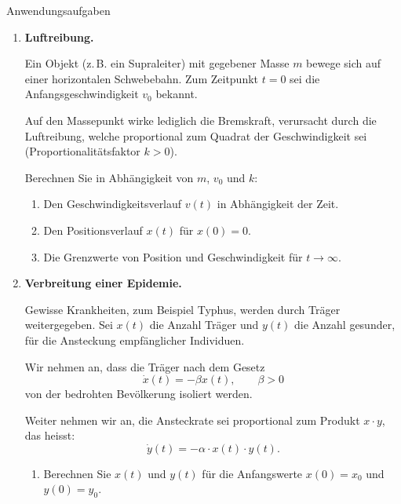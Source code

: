 \begin{ueb}{Anwendungsaufgaben}{}
\begin{enumerate}
        \item \textbf{Luftreibung.}

              Ein Objekt (z.\,B. ein Supraleiter) mit gegebener Masse \(m\)
              bewege sich auf einer horizontalen Schwebebahn.
              Zum Zeitpunkt \(t=0\) sei die Anfangsgeschwindigkeit \(v_0\) bekannt.

              Auf den Massepunkt wirke lediglich die Bremskraft, verursacht
              durch die Luftreibung, welche proportional zum Quadrat der
              Geschwindigkeit sei (Proportionalitätsfaktor \(k>0\)).

              Berechnen Sie in Abhängigkeit von \(m\), \(v_0\) und \(k\):

              \begin{enumerate}
                  \item Den Geschwindigkeitsverlauf \(v(t)\) in Abhängigkeit
                        der Zeit.

                  \item Den Positionsverlauf \(x(t)\) für \(x(0)=0\).

                  \item Die Grenzwerte von Position und Geschwindigkeit
                        für \(t\to\infty\).
              \end{enumerate}

        \item \textbf{Verbreitung einer Epidemie.}

              Gewisse Krankheiten, zum Beispiel Typhus, werden durch Träger
              weitergegeben. Sei \(x(t)\) die Anzahl Träger und \(y(t)\) die
              Anzahl gesunder, für die Ansteckung empfänglicher Individuen.

              Wir nehmen an, dass die Träger nach dem Gesetz
              \[
                  \dot x(t)=-\beta x(t), \qquad \beta>0
              \]
              von der bedrohten Bevölkerung isoliert werden.

              Weiter nehmen wir an, die Ansteckrate sei proportional zum
              Produkt \(x\cdot y\), das heisst:
              \[
                  \dot y(t)=-\alpha\cdot x(t)\cdot y(t).
              \]

              \begin{enumerate}
                  \item Berechnen Sie \(x(t)\) und \(y(t)\) für die Anfangswerte
                        \(x(0)=x_0\) und \(y(0)=y_0\).


\end{enumerate}
\end{enumerate}
\end{ueb}
